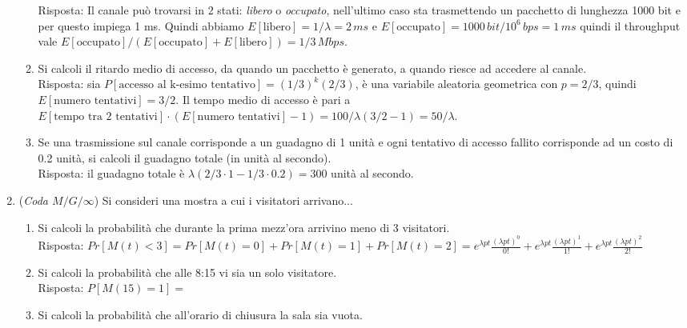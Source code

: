 \documentclass{article}
\begin{document}
\begin{enumerate}
\begin{enumerate}[label=\alph*)]
        Risposta: Il canale può trovarsi in 2 stati: \emph{libero} o \emph{occupato}, nell'ultimo caso sta trasmettendo un pacchetto di lunghezza 1000 bit e per questo impiega 1 ms.
        Quindi abbiamo $E[\text{libero}] = 1/\lambda = 2\,ms$ e $E[\text{occupato}] = 1000\,bit / 10^{6}\,bps = 1\,ms$ quindi il throughput vale $E[\text{occupato}] / (E[\text{occupato}]+E[\text{libero}]) = 1/3\,Mbps$.
        \item Si calcoli il ritardo medio di accesso, da quando un pacchetto è generato, a quando riesce ad accedere al canale.\\
        
        Risposta: sia $P[\text{accesso al k-esimo tentativo}] = (1/3)^k (2/3)$, è una variabile aleatoria geometrica con $p=2/3$, quindi $E[\text{numero tentativi}] = 3/2$.
        Il tempo medio di accesso è pari a $E[\text{tempo tra 2 tentativi}]\cdot (E[\text{numero tentativi}] - 1) = 100/\lambda (3/2 - 1) = 50/\lambda$.
        \item Se una trasmissione sul canale corrisponde a un guadagno di 1 unità e ogni tentativo di accesso fallito corrisponde ad un costo di 0.2 unità, si calcoli il guadagno totale (in unità al secondo).\\
        
        Risposta: il guadagno totale è $\lambda (2/3 \cdot 1 - 1/3\cdot 0.2) = 300$ unità al secondo.
    \end{enumerate}
    
    \item (\emph{Coda $M/G/\infty$}) Si consideri una mostra a cui i visitatori arrivano...
    \begin{enumerate}[label=\alph*)]
        \item Si calcoli la probabilità che durante la prima mezz'ora arrivino meno di 3 visitatori.\\
        
        Risposta: $Pr[M(t) < 3] = Pr[M(t)=0]+Pr[M(t)=1]+Pr[M(t)=2]=e^{\lambda p t}\frac{(\lambda p t)^0}{0!}+e^{\lambda p t}\frac{(\lambda p t)^1}{1!}+e^{\lambda p t}\frac{(\lambda p t)^2}{2!}$
        \item Si calcoli la probabilità che alle 8:15 vi sia un solo visitatore.\\
        
        Risposta: $P[M(15) = 1] = $
        \item Si calcoli la probabilità che all'orario di chiusura la sala sia vuota.\\
        

\end{enumerate}
\end{enumerate}
\end{document}
